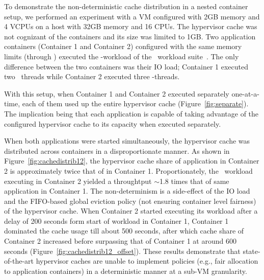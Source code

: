 To demonstrate the non-deterministic cache distribution in a nested 
container setup, we performed an experiment with a VM configured 
with 2GB memory and 4 VCPUs on a host with 32GB memory and 16 CPUs.
%
The hypervisor cache 
was not cognizant of the containers and its size was limited to 1GB.
%
%
Two application containers (Container 1 and Container 2) configured with 
the same memory limits (through \cgroup) executed the \web-workload of the 
\file~workload suite~\cite{filebench}.
%
The only difference between the two containers was their IO load; 
Container 1 executed two
\web~threads while Container 2 executed three \web-threads.
%

With this setup, when Container 1 and Container 2 executed separately one-at-a-time, 
each of them used up the entire hypervisor cache (Figure~\ref{fig:separate}).
%
The implication being that each application is capable of taking advantage 
of the configured hypervisor cache to its capacity when executed separately.
%
%

When both applications were started simultaneously,
the hypervisor
cache was distributed across containers in a disproportionate manner.
%
As shown in Figure~\ref{fig:cachedistrib12}, the hypervisor cache 
share of application in Container 2 is approximately twice
that of in Container 1.
%
Proportionately,
the \web~workload executing in Container 2 yielded a throughtput
$\sim$1.8 times that of same application in Container 1.
%
The non-determinism is a side-effect of the IO load and
the FIFO-based global eviction policy (not ensuring container level fairness) 
of the hypervisor cache.
%
When Container 2 started executing its  workload after a delay of 200 seconds 
form start of workload in Container 1,
%
Container 1 dominated the cache usage till about 500 seconds, after which
cache share of Container 2 increased before surpassing that of 
Container 1 at around 600 seconds (Figure~\ref{fig:cachedistrib12_offset}).
%
%
These results demonstrate that state-of-the-art hypervisor caches are unable to
implement policies (e.g., fair allocation to application containers) in a 
deterministic manner at a sub-VM granularity.
%


